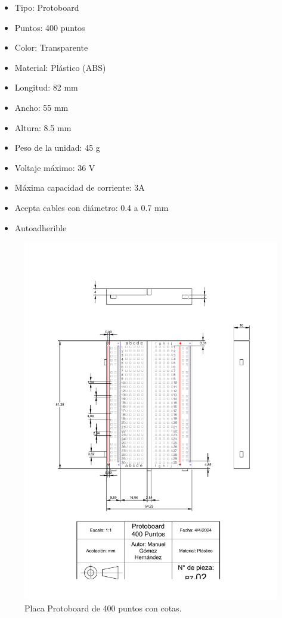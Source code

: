     \begin{itemize}
        \item Tipo: Protoboard
        \item Puntos: 400 puntos
        \item Color: Transparente
        \item Material: Plástico (ABS)
        \item Longitud: 82 mm
        \item Ancho: 55 mm
        \item Altura: 8.5 mm
        \item Peso de la unidad: 45 g
        \item Voltaje máximo: 36 V
        \item Máxima capacidad de corriente: 3A
        \item Acepta cables con diámetro: 0.4 a 0.7 mm
        \item Autoadherible
    \end{itemize}
    
    \begin{figure}[H]
        \centering
        \includegraphics[scale=0.4]{15/img/placaProtoboardTrazo.pdf}
        \caption{Placa Protoboard de 400 puntos con cotas.}
        \label{fig:placaProtoboardTrazo}
    \end{figure}
    
